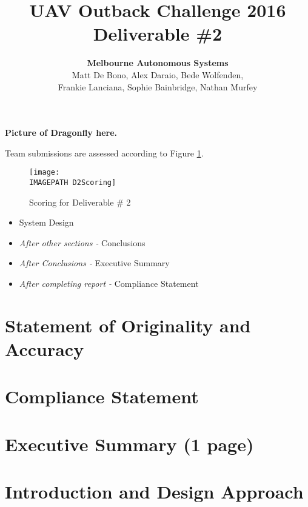\documentclass{article}
\title{UAV Outback Challenge 2016\\ Deliverable \#2\\}
\author{
	\textbf{Melbourne Autonomous Systems}\\
	Matt De Bono,
	Alex Daraio,
	Bede Wolfenden,\\
	Frankie Lanciana,
	Sophie Bainbridge,
	Nathan Murfey}
\newcommand{\IMAGEPATH}{../Images/}
\begin{document}
\maketitle

\textbf{Picture of Dragonfly here.}

\clearpage

\tableofcontents

\clearpage

Team submissions are assessed according to Figure \ref{fig:D2Scoring}.

\begin{figure}[h]
	\centering
	\texttt{[image: \\IMAGEPATH D2Scoring]}
	\caption{Scoring for Deliverable \# 2}
	\label{fig:D2Scoring}
\end{figure}

\begin{itemize}
	\item System Design
	\item \textit{After other sections -} Conclusions
	\item \textit{After Conclusions -} Executive Summary
	\item \textit{After completing report -} Compliance Statement
\end{itemize}

\clearpage

\section{Statement of Originality and Accuracy}


\clearpage

\section{Compliance Statement}
\begin{figure}
	
\end{figure}


\clearpage
\section{Executive Summary (1 page)}


\clearpage
\section{Introduction and Design Approach}

\end{document}
